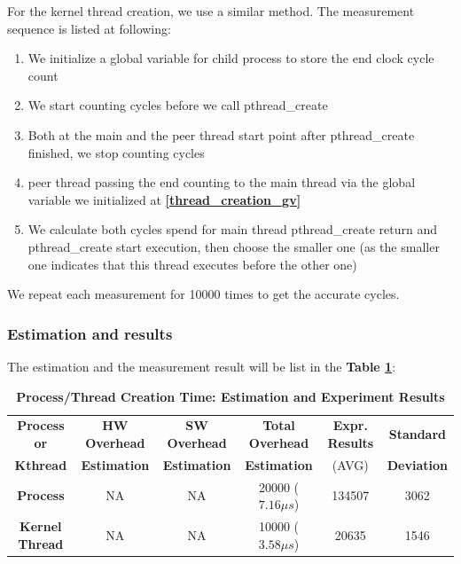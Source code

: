 For the kernel thread creation, we use a similar method. The measurement sequence is listed at following:
\begin{enumerate}
    \item We initialize a global variable for child process to store the end clock cycle count \label{thread_creation_gv}
    \item We start counting cycles before we call pthread\_create
    \item Both at the main and the peer thread start point after pthread\_create finished, we stop counting cycles
    \item peer thread passing the end counting to the main thread via the global variable we initialized at \textbf{\ref{thread_creation_gv}}
    \item We calculate both cycles spend for main thread pthread\_create return and pthread\_create start execution, then choose the smaller one (as the smaller one indicates that this thread executes before the other one)
\end{enumerate}

We repeat each measurement for 10000 times to get the accurate cycles.

\subsubsection{Estimation and results}

The estimation and the measurement result will be list in the \textbf{Table \ref{process_creation_time}}:

\begin{table}[ht]
  \centering
  \caption{\textbf{Process/Thread Creation Time: Estimation and Experiment Results}}
  \begin{threeparttable}
  \begin{tabular}{cccccc}
  \hline
      \textbf{Process or} & \textbf{HW Overhead} & \textbf{SW Overhead } & \textbf{Total Overhead} & \textbf{Expr. Results} & \textbf{Standard}\\
      \textbf{Kthread} & \textbf{Estimation}       &  \textbf{Estimation}         & \textbf{Estimation}  & (AVG)   & \textbf{Deviation} \\
  \hline
      \textbf{Process} & NA & NA & 20000 ($7.16 \mu s$) & 134507 & 3062 \\
      \textbf{Kernel Thread} & NA & NA & 10000 ($3.58 \mu s$) & 20635 & 1546 \\
  \hline
  \end{tabular}
  \end{threeparttable}
  \label{process_creation_time}
\end{table}

